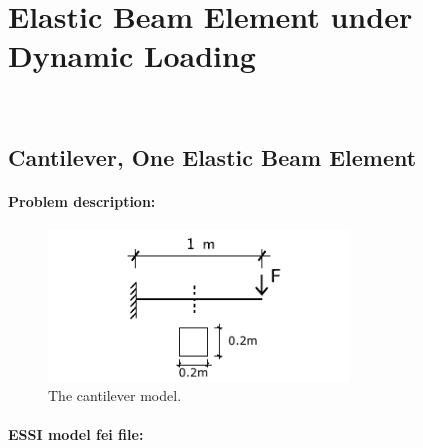 \documentclass[fleqn,11pt]{article}
\begin{document}
\newpage
\section{Elastic Beam Element under Dynamic Loading} ~ 


\subsection{Cantilever, One Elastic Beam Element} 


\paragraph{Problem description:}

% 
% 
% 

\begin{figure}[!htb]
  \centering
  \includegraphics[width=8cm]{../Figure-files/_Chapter_Appendix_Illustrative_Examples/cantilever.pdf}
  \caption{The cantilever model.}
  \label{fig-canti_1beam}
\end{figure}


\paragraph{ESSI model fei file: } ~
\end{document}
